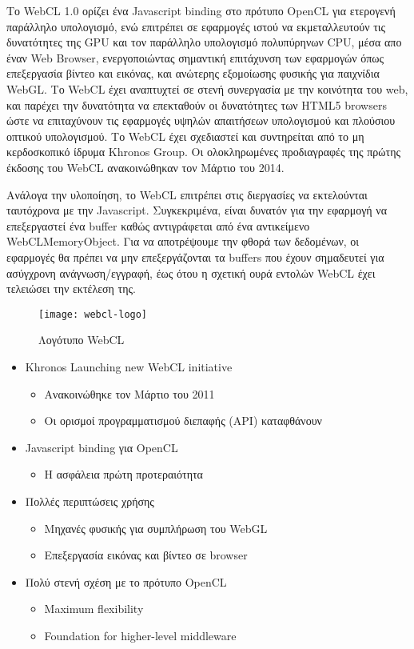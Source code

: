 Το WebCL 1.0 ορίζει ένα Javascript binding στο πρότυπο OpenCL για ετερογενή παράλληλο υπολογισμό, ενώ επιτρέπει σε εφαρμογές ιστού να εκμεταλλευτούν τις δυνατότητες της GPU και τον παράλληλο υπολογισμό πολυπύρηνων CPU, μέσα απο έναν Web Browser, ενεργοποιώντας σημαντική επιτάχυνση των εφαρμογών όπως επεξεργασία βίντεο και εικόνας, και ανώτερης εξομοίωσης φυσικής για παιχνίδια WebGL. Το WebCL έχει αναπτυχτεί σε στενή συνεργασία με την κοινότητα του web, και παρέχει την δυνατότητα να επεκταθούν οι δυνατότητες των HTML5 browsers ώστε να επιταχύνουν τις εφαρμογές υψηλών απαιτήσεων υπολογισμού και πλούσιου οπτικού υπολογισμού. Το WebCL έχει σχεδιαστεί και συντηρείται από το μη κερδοσκοπικό ίδρυμα Khronos Group. Οι ολοκληρωμένες προδιαγραφές της πρώτης έκδοσης του WebCL ανακοινώθηκαν τον Μάρτιο του 2014.\cite{opencl-5} 

Ανάλογα την υλοποίηση, το WebCL επιτρέπει στις διεργασίες να εκτελούνται ταυτόχρονα με την Javascript. Συγκεκριμένα, είναι δυνατόν για την εφαρμογή να επεξεργαστεί ένα buffer καθώς αντιγράφεται από ένα αντικείμενο WebCLMemoryObject. Για να αποτρέψουμε την φθορά των δεδομένων, οι εφαρμογές θα πρέπει να μην επεξεργάζονται τα buffers που έχουν σημαδευτεί για ασύγχρονη ανάγνωση/εγγραφή, έως ότου η σχετική ουρά εντολών WebCL έχει τελειώσει την εκτέλεση της.

\begin{figure}[h]
	\texttt{[image: webcl-logo]}
	\centering
	\caption{Λογότυπο WebCL\cite{figure-5}}
\end{figure}
\begin{itemize}
\item Khronos Launching new WebCL initiative
	\begin{itemize}
	\item Ανακοινώθηκε τον Μάρτιο του 2011
	\item Οι ορισμοί προγραμματισμού διεπαφής (API) καταφθάνουν
	\end{itemize}
\item Javascript binding για OpenCL
	\begin{itemize}
	\item Η ασφάλεια πρώτη προτεραιότητα
	\end{itemize}
\item Πολλές περιπτώσεις χρήσης
	\begin{itemize}
	\item Μηχανές φυσικής για συμπλήρωση του WebGL
	\item Επεξεργασία εικόνας και βίντεο σε browser
	\end{itemize}
\item Πολύ στενή σχέση με το πρότυπο OpenCL
	\begin{itemize}
	\item Maximum flexibility
	\item Foundation for higher-level middleware
	\end{itemize}
\end{itemize}


